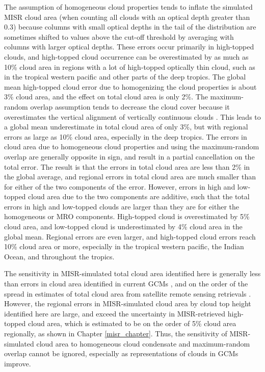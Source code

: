 The assumption of homogeneous cloud properties tends to inflate the simulated MISR cloud area (when counting all clouds with an optical depth greater than 0.3) because columns with small optical depths in the tail of the distribution are sometimes shifted to values above the cut-off threshold by averaging with columns with larger optical depths. These errors occur primarily in high-topped clouds, and high-topped cloud occurrence can be overestimated by as much as 10\% cloud area in regions with a lot of high-topped optically thin cloud, such as in the tropical western pacific and other parts of the deep tropics. The global mean high-topped cloud error due to homogenizing the cloud properties is about 3\% cloud area, and the effect on total cloud area is only 2\%.  The maximum-random overlap assumption tends to decrease the cloud cover because it overestimates the vertical alignment of vertically continuous clouds \citep{mace_and_benson-troth_2002, hogan_and_illingworth_2000, barker_2008}. This leads to a global mean underestimate in total cloud area of only 3\%, but with regional errors as large as 10\% cloud area, especially in the deep tropics. The errors in cloud area due to homogeneous cloud properties and using the maximum-random overlap are generally opposite in sign, and result in a partial cancellation on the total error. The result is that the errors in total cloud area are less than 2\% in the global average, and regional errors in total cloud area are much smaller than for either of the two components of the error. However, errors in high and low-topped cloud area due to the two components are additive, such that the total errors in high and low-topped clouds are larger than they are for either the homogeneous or MRO components. High-topped cloud is overestimated by 5\% cloud area, and low-topped cloud is underestimated by 4\% cloud area in the global mean. Regional errors are even larger, and high-topped cloud errors reach 10\% cloud area or more, especially in the tropical western pacific, the Indian Ocean, and throughout the tropics.

The sensitivity in MISR-simulated total cloud area identified here is generally less than errors in cloud area identified in current GCMs \citep{kay_et_al_2012, klein_et_al_2013, bodas-salcedo_et_al_2011}, and on the order of the spread in estimates of total cloud area from satellite remote sensing retrievals \cite{marchand_et_al_2010, pincus_et_al_2012}. However, the regional errors in MISR-simulated cloud area by cloud top height identified here are large, and exceed the uncertainty in MISR-retrieved high-topped cloud area, which is estimated to be on the order of 5\% cloud area regionally, as shown in Chapter \ref{misr_chapter}. Thus, the sensitivity of MISR-simulated cloud area to homogeneous cloud condensate and maximum-random overlap cannot be ignored, especially as representations of clouds in GCMs improve. 

